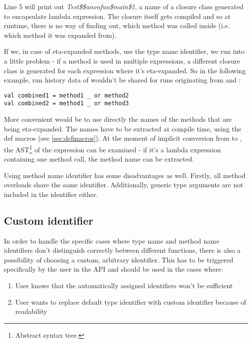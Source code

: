 Line 5 will print out \textit{Test\$\$anonfun\$main\$1}, a name of a closure class generated to encapsulate lambda expression. The closure itself gets compiled and so at runtime, there is no way of finding out, which method was called inside (i.e. which method it was expanded from).

If we, in case of eta-expanded methods, use the type name identifier, we run into a little problem - if a method is used in multiple  expressions, a different closure class is generated for each expression where it's eta-expanded. So in the following example, run history data of  wouldn't be shared for runs originating from  and :

\lstset{style=Scala}
\begin{lstlisting}
val combined1 = method1 _ or method2
val combined2 = method1 _ or method3
\end{lstlisting}

More convenient would be to use directly the names of the methods that are being eta-expanded. The names have to be extracted at compile time, using the def macros (see \ref{sec:defmacros}). At the moment of implicit conversion from  to , the AST\footnote{Abstract syntax tree.} of the  expression can be examined - if it's a lambda expression containing one method call, the method name can be extracted.

Using method name identifier has some disadvantages as well. Firstly, all method overloads share the same identifier. Additionally, generic type arguments are not included in the identifier either.

\subsection{Custom identifier}

In order to handle the specific cases where type name and method name identifiers don't distinguish correctly between different functions, there is also a possibility of choosing a custom, arbitrary identifier. This has to be triggered specifically by the user in the API and should be used in the cases where:

\begin{enumerate}
	\item User knows that the automatically assigned identifiers won't be sufficient
	\item User wants to replace default type identifier with custom identifier because of readability
\end{enumerate}

